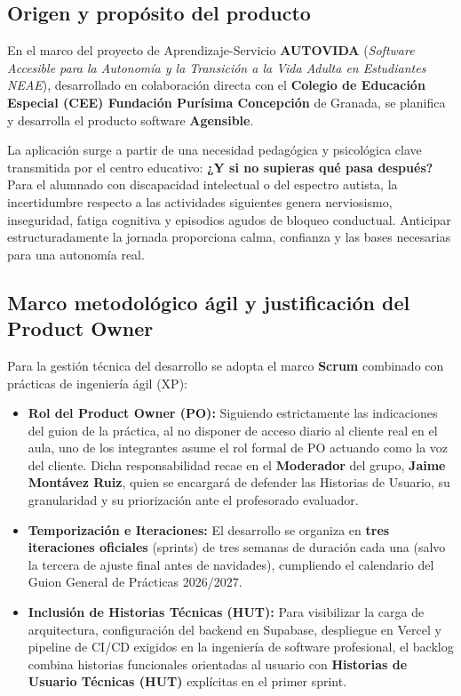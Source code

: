 \documentclass[11pt,a4paper]{article}
\newcommand{\hl}[1]{\textcolor{gblue}{\textbf{#1}}}
\begin{document}
\subsection{Origen y propósito del producto}
En el marco del proyecto de Aprendizaje-Servicio \hl{AUTOVIDA} (\textit{Software Accesible para la Autonomía y la Transición a la Vida Adulta en Estudiantes NEAE}), desarrollado en colaboración directa con el \hl{Colegio de Educación Especial (CEE) Fundación Purísima Concepción} de Granada, se planifica y desarrolla el producto software \hl{Agensible}.

La aplicación surge a partir de una necesidad pedagógica y psicológica clave transmitida por el centro educativo: \textbf{¿Y si no supieras qué pasa después?} Para el alumnado con discapacidad intelectual o del espectro autista, la incertidumbre respecto a las actividades siguientes genera nerviosismo, inseguridad, fatiga cognitiva y episodios agudos de bloqueo conductual. Anticipar estructuradamente la jornada proporciona calma, confianza y las bases necesarias para una autonomía real.

\subsection{Marco metodológico ágil y justificación del Product Owner}
Para la gestión técnica del desarrollo se adopta el marco \hl{Scrum} combinado con prácticas de ingeniería ágil (XP):

\begin{itemize}
\item \textbf{Rol del Product Owner (PO):} Siguiendo estrictamente las indicaciones del guion de la práctica, al no disponer de acceso diario al cliente real en el aula, uno de los integrantes asume el rol formal de PO actuando como la voz del cliente. Dicha responsabilidad recae en el \hl{Moderador} del grupo, \textbf{Jaime Montávez Ruiz}, quien se encargará de defender las Historias de Usuario, su granularidad y su priorización ante el profesorado evaluador.
\item \textbf{Temporización e Iteraciones:} El desarrollo se organiza en \hl{tres iteraciones oficiales} (sprints) de tres semanas de duración cada una (salvo la tercera de ajuste final antes de navidades), cumpliendo el calendario del Guion General de Prácticas 2026/2027.
\item \textbf{Inclusión de Historias Técnicas (HUT):} Para visibilizar la carga de arquitectura, configuración del backend en Supabase, despliegue en Vercel y pipeline de CI/CD exigidos en la ingeniería de software profesional, el backlog combina historias funcionales orientadas al usuario con \hl{Historias de Usuario Técnicas (HUT)} explícitas en el primer sprint.
\end{itemize}
\end{document}
